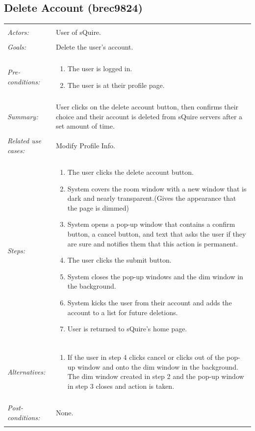 \documentclass[11pt]{report}
\begin{document}
\subsection{Delete Account (brec9824)}
\begin{tabular}{ p{2cm} p{12cm} }
 \hline
 \\
 \textit{Actors:} & User of sQuire. \\ 
 \\
 \textit{Goals:} & Delete the user's account. \\
 \\
 \textit{Pre-conditions:} & \begin{enumerate}
  \item The user is logged in.
  \item The user is at their profile page.
 \end{enumerate} \\
 \\
 \textit{Summary:} & User clicks on the delete account button, then confirms their choice and their account is deleted from sQuire servers after a set amount of time.\\ 
 \\
 \textit{Related use cases:} & Modify Profile Info. \\ 
 \\
 \textit{Steps:} & \begin{enumerate}
  \item The user clicks the delete account button.
  \item System covers the room window with a new window that is dark and nearly transparent.(Gives the appearance that the page is dimmed) 
  \item System opens a pop-up window that contains a confirm button, a cancel button, and text that asks the user if they are sure and notifies them that this action is permanent.
  \item The user clicks the submit button.
  \item System closes the pop-up windows and the dim window in the background.
  \item System kicks the user from their account and adds the account to a list for future deletions.
  \item User is returned to sQuire's home page.
 \end{enumerate} \\
 \\
 \textit{Alternatives:} & \begin{enumerate} 
  \item If the user in step 4 clicks cancel or clicks out of the pop-up window and onto the dim window in the background. The dim window created in step 2 and the pop-up window in step 3 closes and action is taken.
 \end{enumerate} \\
 \\
 \textit{Post-conditions:} & None. \\
 \\
\hline
\end{tabular}
\end{document}
